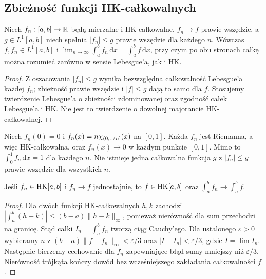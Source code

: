 \subsection*{Zbieżność funkcji HK-całkowalnych}
\begin{twierdzenie}\label{tw:hk-zbieznosc-dct}
Niech $f_n:[a,b]\to\mathbb R$ będą mierzalne i HK-całkowalne, $f_n\to f$ prawie wszędzie, a $g\in L^1[a,b]$ niech spełnia $|f_n|\le g$ prawie wszędzie dla każdego $n$. Wówczas $f,f_n\in L^1[a,b]$ i
$\lim_{n\to\infty}\int_a^bf_n\,\mathrm dx=\int_a^bf\,\mathrm dx$, przy czym po obu stronach całkę można rozumieć zarówno w sensie Lebesgue'a, jak i HK.
\end{twierdzenie}
\begin{proof}
Z oszacowania $|f_n|\le g$ wynika bezwzględna całkowalność Lebesgue'a każdej $f_n$; zbieżność prawie wszędzie i $|f|\le g$ dają to samo dla $f$. Stosujemy twierdzenie Lebesgue'a o zbieżności zdominowanej oraz zgodność całek Lebesgue'a i HK. Nie jest to twierdzenie o dowolnej majorancie HK-całkowalnej.
\end{proof}
\begin{przyklad}
Niech $f_n(0)=0$ i $f_n(x)=n\chi_{(0,1/n]}(x)$ na $[0,1]$. Każda $f_n$ jest Riemanna, a więc HK-całkowalna, oraz $f_n(x)\to0$ w każdym punkcie $[0,1]$. Mimo to $\int_0^1f_n\,\mathrm dx=1$ dla każdego $n$. Nie istnieje jedna całkowalna funkcja $g$ z $|f_n|\le g$ prawie wszędzie dla wszystkich $n$.
\end{przyklad}
\begin{stwierdzenie}\label{st:hk-zbieznosc-jednostajna}
Jeśli $f_n\in\mathrm{HK}[a,b]$ i $f_n\to f$ jednostajnie, to $f\in\mathrm{HK}[a,b]$ oraz $\int_a^bf_n\to\int_a^bf$.
\end{stwierdzenie}
\begin{proof}
Dla dwóch funkcji HK-całkowalnych $h,k$ zachodzi $|\int_a^b(h-k)|\le(b-a)\|h-k\|_\infty$, ponieważ nierówność dla sum przechodzi na granicę. Stąd całki $I_n=\int_a^bf_n$ tworzą ciąg Cauchy'ego. Dla ustalonego $\varepsilon>0$ wybieramy $n$ z $(b-a)\|f-f_n\|_\infty<\varepsilon/3$ oraz $|I-I_n|<\varepsilon/3$, gdzie $I=\lim I_n$. Następnie bierzemy cechowanie dla $f_n$ zapewniające błąd sumy mniejszy niż $\varepsilon/3$. Nierówność trójkąta kończy dowód bez wcześniejszego zakładania całkowalności $f$.
\end{proof}

